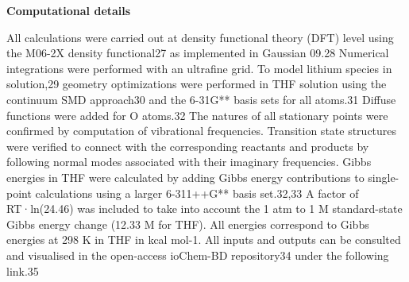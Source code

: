 \documentclass[journal=jacsat,manuscript=article]{achemso}
\begin{document}
	{\bf Computational details}
	
	All calculations were carried out at density functional theory (DFT) level using the M06-2X density functional27 as
	implemented in Gaussian 09.28 Numerical integrations were performed with an ultrafine grid. To model lithium species in
	solution,29 geometry optimizations were performed in THF solution using the continuum SMD approach30 and the 6-31G** basis sets for all atoms.31 Diffuse functions were added for O atoms.32 The natures of all stationary points were confirmed by computation of vibrational frequencies. Transition	state structures were verified to connect with the corresponding reactants and products by following normal modes associated with their imaginary frequencies. Gibbs energies in	THF were calculated by adding Gibbs energy contributions to	single-point calculations using a larger 6-311++G** basis set.32,33 A factor of RT·ln(24.46) was included to take into account the 1 atm to 1 M standard-state Gibbs energy change	(12.33 M for THF). All energies correspond to Gibbs energies at 298 K in THF in kcal mol-1. All inputs and outputs can be consulted and visualised in the open-access ioChem-BD repository34 under the following link.35
	
\end{document}
